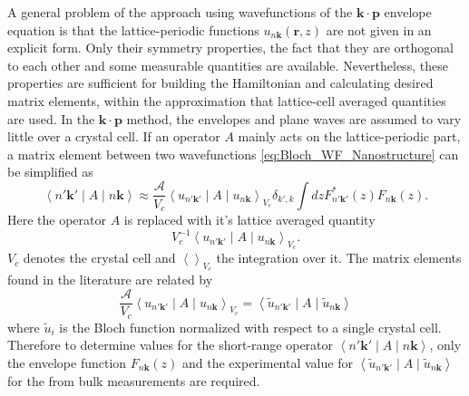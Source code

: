 A general problem of the approach using wavefunctions of the $\mathbf{k}\cdot\mathbf{p}$
envelope equation is that the lattice-periodic functions $u_{n\mathbf{k}}(\mathbf{r},z)$
are not given in an explicit form. Only their symmetry properties,
the fact that they are orthogonal to each other and some measurable
quantities are available. Nevertheless, these properties are sufficient
for building the Hamiltonian and calculating desired matrix elements,
within the approximation that lattice-cell averaged quantities are
used. In the $\mathbf{k}\cdot\mathbf{p}$ method, the envelopes and
plane waves are assumed to vary little over a crystal cell. If an
operator $A$ mainly acts on the lattice-periodic part, a matrix element
between two wavefunctions \ref{eq:Bloch_WF_Nanostructure} can be
simplified as\begin{equation}
\left\langle n'\mathbf{k}'\mid A\mid n\mathbf{k}\right\rangle \approx\frac{\mathcal{A}}{V_{c}}\left\langle u_{n'\mathbf{k}'}\mid A\mid u_{n\mathbf{k}}\right\rangle _{V_{c}}\delta_{k',k}\int dzF_{n'\mathbf{k}'}^{*}(z)F_{n\mathbf{k}}(z).\end{equation}
Here the operator $A$ is replaced with it's lattice averaged quantity\[
V_{c}^{-1}\left\langle u_{n'\mathbf{k}'}\mid A\mid u_{n\mathbf{k}}\right\rangle _{V_{c}}.\]
$V_{c}$ denotes the crystal cell and $\left\langle \right\rangle _{V_{c}}$
the integration over it. The matrix elements found in the literature
are related by \begin{equation}
\frac{\mathcal{A}}{V_{c}}\left\langle u_{n'\mathbf{k}'}\mid A\mid u_{n\mathbf{k}}\right\rangle _{V_{c}}=\left\langle \tilde{u}_{n'\mathbf{k}'}\mid A\mid\tilde{u}_{n\mathbf{k}}\right\rangle \label{eq:Matrix_Elements_Relation}\end{equation}
where $\tilde{u}_{i}$ is the Bloch function normalized with respect
to a single crystal cell. Therefore to determine values for the short-range
operator $\left\langle n'\mathbf{k}'\mid A\mid n\mathbf{k}\right\rangle $,
only the envelope function $F_{n\mathbf{k}}(z)$ and the experimental
value for $\left\langle \tilde{u}_{n'\mathbf{k}'}\mid A\mid\tilde{u}_{n\mathbf{k}}\right\rangle $
for the from bulk measurements are required.

